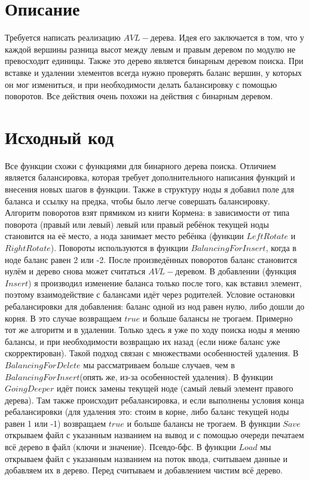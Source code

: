 \section{Описание}
Требуется написать реализацию $AVL-$дерева. Идея его заключается в том, что у каждой вершины разница высот между левым и правым деревом по модулю не превосходит единицы. Также это дерево является бинарным деревом поиска. При вставке и удалении элементов всегда нужно проверять баланс вершин, у которых он мог измениться, и при необходимости делать балансировку с помощью поворотов. Все действия очень похожи на действия с бинарным деревом.

\pagebreak

\section{Исходный код}

Все функции схожи с функциями для бинарного дерева поиска. Отличием является балансировка, которая требует дополнительного написания функций и внесения новых шагов в функции. Также в структуру ноды я добавил поле для баланса и ссылку на предка, чтобы было легче совершать балансировку. Алгоритм поворотов взят прямиком из  книги Кормена: в зависимости от типа поворота (правый или левый) левый или правый ребёнок текущей ноды становится на её место, а нода занимает место ребёнка (функции $LeftRotate$ и $RightRotate$). Повороты используются в функции $BalancingForInsert$, когда в ноде баланс равен 2 или -2. После произведённых поворотов баланс становится нулём и дерево снова может считаться $AVL-$деревом. В добавлении (функция $Insert$) я производил изменение баланса только после того, как вставил элемент, поэтому взаимодействие с балансами идёт через родителей. Условие остановки ребалансировки для добавления: баланс одной из нод равен нулю, либо дошли до корня. В это случае возвращаем $true$ и больше балансы не трогаем. Примерно тот же алгоритм и в удалении. Только здесь я уже по ходу поиска ноды я меняю балансы, и при необходимости возвращаю их назад (если ниже баланс уже скорректирован). Такой подход связан с множествами особенностей удаления. В $BalancingForDelete$ мы рассматриваем больше случаев, чем в $BalancingForInsert$(опять же, из-за особенностей удаления). В функции $GoingDeeper$ идёт поиск замены текущей ноде (самый левый элемент правого дерева). Там также происходит ребалансировка, и если выполнены условия конца ребалансировки (для удаления это: стоим в корне, либо баланс текущей ноды равен 1 или -1) возвращаем $true$ и больше балансы не трогаем. В функции $Save$ открываем файл с указанным названием на вывод и с помощью очереди печатаем всё дерево в файл (ключи и значение). Псевдо-бфс. В функции $Load$ мы открываем файл с указанным названием на поток ввода, считываем данные и добавляем их в дерево. Перед считываем и добавлением чистим всё дерево.

